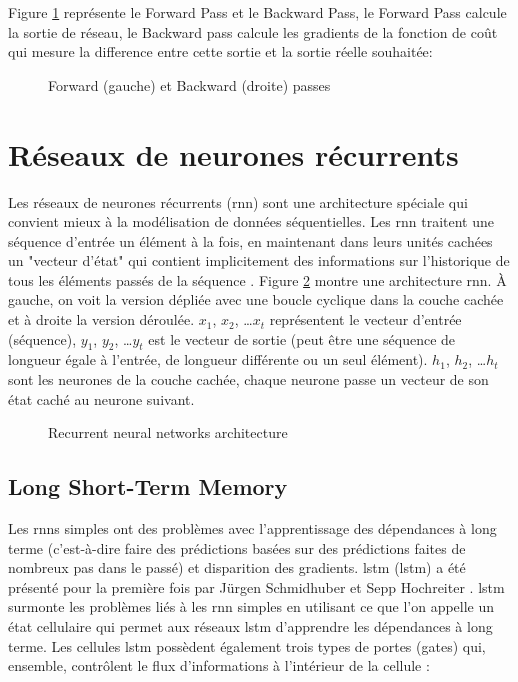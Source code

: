 Figure \ref{fig:forward-backward-pass} représente le Forward Pass et le Backward Pass, le Forward Pass calcule la sortie de réseau, le Backward pass calcule les gradients de la fonction de coût qui mesure la difference entre cette sortie et la sortie réelle souhaitée:

\begin{figure}[h]
    \centering
	
    \caption{Forward (gauche) et Backward (droite) passes}
    \label{fig:forward-backward-pass}
\end{figure}


\section{Réseaux de neurones récurrents}
Les réseaux de neurones récurrents (\acrshort{rnn}) sont une architecture spéciale qui convient mieux à la modélisation de données séquentielles. Les \acrshort{rnn} traitent une séquence d'entrée un élément à la fois, en maintenant dans leurs unités cachées un "vecteur d'état" qui contient implicitement des informations sur l'historique de tous les éléments passés de la séquence \cite{LeCun2015}. Figure \ref{fig:rnn} montre une architecture \acrshort{rnn}. À gauche, on voit la version dépliée avec une boucle cyclique dans la couche cachée et à droite la version déroulée. $x_1$, $x_2$, …$x_t$ représentent le vecteur d'entrée (séquence), $y_1$, $y_2$, …$y_t$ est le vecteur de sortie (peut être une séquence de longueur égale à l'entrée, de longueur différente ou un seul élément). $h_1$, $h_2$, …$h_t$ sont les neurones de la couche cachée, chaque neurone passe un vecteur de son état caché au neurone suivant.

\begin{figure}[H]
    \centering
    
    \caption{Recurrent neural networks architecture}
    \label{fig:rnn}
\end{figure}

\subsection{Long Short-Term Memory}
\label{section:lstm}
Les \acrshort{rnn}s simples ont des problèmes avec l'apprentissage des dépendances à long terme (c'est-à-dire faire des prédictions basées sur des prédictions faites de nombreux pas dans le passé) et disparition des gradients. \acrlong{lstm} (\acrshort{lstm}) a été présenté pour la première fois par Jürgen Schmidhuber et Sepp Hochreiter \cite{Hochreiter1997}. \acrshort{lstm} surmonte les problèmes liés à les \acrshort{rnn} simples en utilisant ce que l'on appelle un état cellulaire qui permet aux réseaux \acrshort{lstm} d'apprendre les dépendances à long terme. Les cellules \acrshort{lstm} possèdent également trois types de portes (gates) qui, ensemble, contrôlent le flux d'informations à l'intérieur de la cellule :

